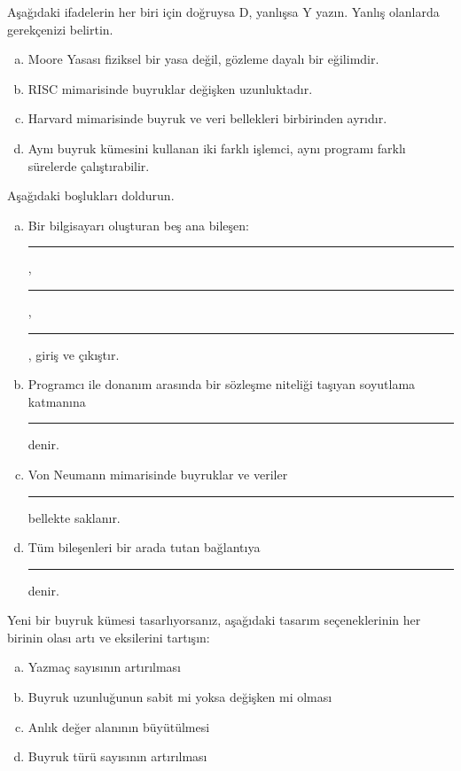 \begin{alistirma}[\orta]
Aşağıdaki ifadelerin her biri için doğruysa D, yanlışsa Y yazın. Yanlış olanlarda gerekçenizi belirtin.
\begin{enumerate}[(a)]
    \item Moore Yasası fiziksel bir yasa değil, gözleme dayalı bir eğilimdir.
    \item RISC mimarisinde buyruklar değişken uzunluktadır.
    \item Harvard mimarisinde buyruk ve veri bellekleri birbirinden ayrıdır.
    \item Aynı buyruk kümesini kullanan iki farklı işlemci, aynı programı farklı sürelerde çalıştırabilir.
\end{enumerate}
\end{alistirma}

\begin{alistirma}[\kolay]
Aşağıdaki boşlukları doldurun.
\begin{enumerate}[(a)]
    \item Bir bilgisayarı oluşturan beş ana bileşen: \rule{2cm}{0.4pt}, \rule{2cm}{0.4pt}, \rule{2cm}{0.4pt}, giriş ve çıkıştır.
    \item Programcı ile donanım arasında bir sözleşme niteliği taşıyan soyutlama katmanına \rule{3cm}{0.4pt} denir.
    \item Von Neumann mimarisinde buyruklar ve veriler \rule{3cm}{0.4pt} bellekte saklanır.
    \item Tüm bileşenleri bir arada tutan bağlantıya \rule{2cm}{0.4pt} denir.
\end{enumerate}
\end{alistirma}

\begin{alistirma}[\zor]
Yeni bir buyruk kümesi tasarlıyorsanız, aşağıdaki tasarım seçeneklerinin her birinin olası artı ve eksilerini tartışın:
\begin{enumerate}[(a)]
    \item Yazmaç sayısının artırılması
    \item Buyruk uzunluğunun sabit mi yoksa değişken mi olması
    \item Anlık değer alanının büyütülmesi
    \item Buyruk türü sayısının artırılması
\end{enumerate}
\end{alistirma}


